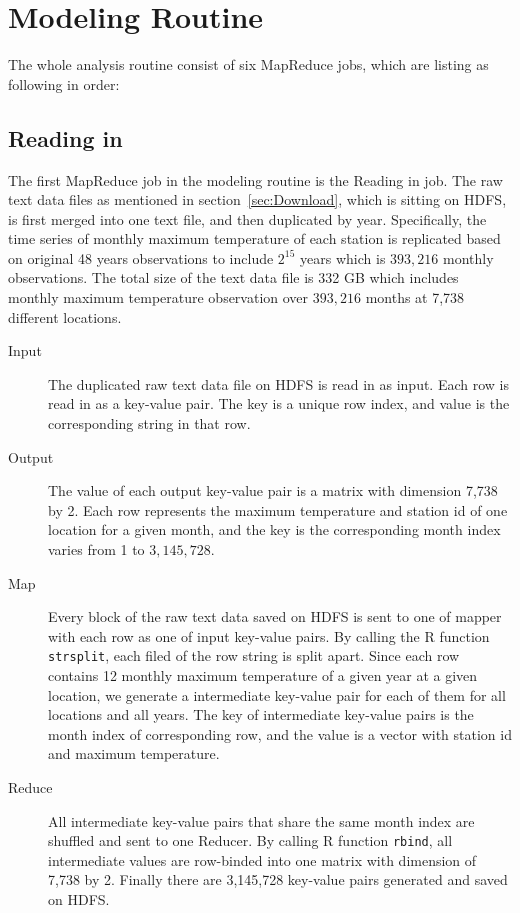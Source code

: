 \section{Modeling Routine}

The whole analysis routine consist of six MapReduce jobs, which are listing as
following in order:

\subsection{Reading in}

The first MapReduce job in the modeling routine is the Reading in job.
The raw text data files as mentioned in section~\ref{sec:Download}, which is 
sitting on HDFS, is first merged into one text file, and then duplicated by
year. Specifically, the time series of monthly maximum temperature of each station
is replicated based on original 48 years observations to include $2^{15}$ years 
which is $393,216$ monthly observations. 
The total size of the text data file is 332 GB which includes monthly maximum
temperature observation over $393,216$ months at 7,738 different locations.

\begin{description}
  \item[Input] The duplicated raw text data file on HDFS is read in as input. Each
  row is read in as a key-value pair. The key is a unique row index, and value
  is the corresponding string in that row. 
  \item[Output] The value of each output key-value pair is a matrix with dimension
  7,738 by 2. Each row represents the maximum temperature and station id of one 
  location for a given month, and the key is the corresponding month index varies 
  from 1 to $3,145,728$. 
  \item[Map] Every block of the raw text data saved on HDFS is sent to one of 
  mapper with each row as one of input key-value pairs. By calling the R function
  \texttt{strsplit}, each filed of the row string is split apart. Since each
  row contains 12 monthly maximum temperature of a given year at a given location,
  we generate a intermediate key-value pair for each of them for all locations
  and all years. The key of 
  intermediate key-value pairs is the month index of corresponding row, and the 
  value is a vector with station id and maximum temperature.
  \item[Reduce] All intermediate key-value pairs that share the same month index
  are shuffled and sent to one Reducer. By calling R function \texttt{rbind}, 
  all intermediate values are row-binded into one matrix with dimension of 7,738
  by 2. Finally there are 3,145,728 key-value pairs generated and saved on HDFS.
\end{description}

